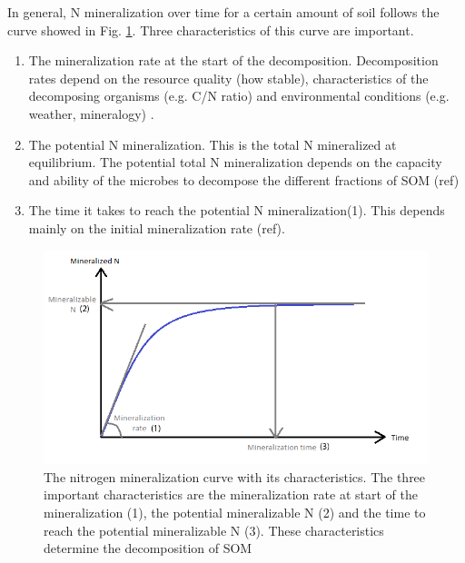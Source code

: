 \documentclass[10pt,twoside,dutch,english]{report}
\begin{document}
In general, N mineralization over time for a certain amount of soil  follows the curve showed in Fig. \ref{fig:intro_Ncum}. Three characteristics of this curve are important. 
\begin{enumerate}
	\item The mineralization rate at the start of the decomposition. Decomposition rates depend on the resource quality (how stable), characteristics of the decomposing organisms (e.g. C/N ratio) and environmental conditions (e.g. weather, mineralogy) \citep{Lavelle1993}. 
	\item The potential N mineralization. This is the total N mineralized at equilibrium. The potential total N mineralization depends on the capacity and ability of the microbes to decompose the different fractions of SOM (ref)
	\item The time it takes to reach the potential N mineralization(1). This depends mainly on the initial mineralization rate (ref).
\end{enumerate}


\begin{figure}[h]
	\includegraphics[width=1\linewidth]{intro_Ncum}
	\caption{The nitrogen mineralization curve with its characteristics. The three important characteristics are the mineralization rate at start of the mineralization (1), the potential mineralizable N (2) and the time to reach the potential mineralizable N (3). These characteristics determine the decomposition of SOM}
	\label{fig:intro_Ncum}
\end{figure}
\end{document}
